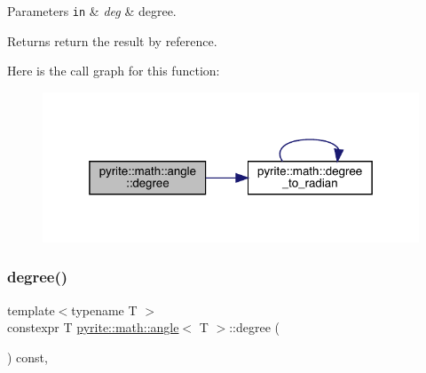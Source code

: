 \begin{DoxyParams}[1]{Parameters}
\mbox{\tt in}  & {\em deg} & degree. \\
\hline
\end{DoxyParams}
\begin{DoxyReturn}{Returns}
return the result by reference. 
\end{DoxyReturn}
Here is the call graph for this function\+:
\nopagebreak
\begin{figure}[H]
\begin{center}
\leavevmode
\includegraphics[width=319pt]{d0/df1/classpyrite_1_1math_1_1angle_a7e27daa8c8cb81986a146495664dfaba_cgraph}
\end{center}
\end{figure}
\mbox{\label{classpyrite_1_1math_1_1angle_a52d68b9f0b2bedfed7fa09782dba0e82}} 
\subsubsection{\texorpdfstring{degree()}{degree()}\hspace{0.1cm}{\footnotesize\ttfamily [2/2]}}
{\footnotesize\ttfamily template$<$typename T $>$ \\
constexpr T \mbox{\hyperlink{classpyrite_1_1math_1_1angle}{pyrite\+::math\+::angle}}$<$ T $>$\+::degree (\begin{DoxyParamCaption}{ }\end{DoxyParamCaption}) const\hspace{0.3cm}{\ttfamily [inline]}, {\ttfamily [noexcept]}}

